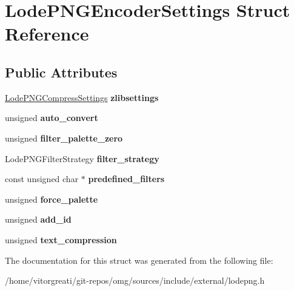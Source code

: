 \hypertarget{struct_lode_p_n_g_encoder_settings}{}\section{Lode\+P\+N\+G\+Encoder\+Settings Struct Reference}
\label{struct_lode_p_n_g_encoder_settings}
\subsection*{Public Attributes}
\begin{DoxyCompactItemize}
\item 
\mbox{\label{struct_lode_p_n_g_encoder_settings_a2c5928b4172c75e27de467870f2ff946}} 
\mbox{\hyperlink{struct_lode_p_n_g_compress_settings}{Lode\+P\+N\+G\+Compress\+Settings}} {\bfseries zlibsettings}
\item 
\mbox{\label{struct_lode_p_n_g_encoder_settings_a1203b8db6532c9ff4a5c8ee692cd327a}} 
unsigned {\bfseries auto\+\_\+convert}
\item 
\mbox{\label{struct_lode_p_n_g_encoder_settings_a0d82e8f2fabcb6cebbc54b80922945f1}} 
unsigned {\bfseries filter\+\_\+palette\+\_\+zero}
\item 
\mbox{\label{struct_lode_p_n_g_encoder_settings_a5e18e4eb941763a2e3e6c65ee9f0729c}} 
Lode\+P\+N\+G\+Filter\+Strategy {\bfseries filter\+\_\+strategy}
\item 
\mbox{\label{struct_lode_p_n_g_encoder_settings_a4446f87b5283f25664802a1be037e76e}} 
const unsigned char $\ast$ {\bfseries predefined\+\_\+filters}
\item 
\mbox{\label{struct_lode_p_n_g_encoder_settings_a04dc9622ccd1d7c74c56291409aa512a}} 
unsigned {\bfseries force\+\_\+palette}
\item 
\mbox{\label{struct_lode_p_n_g_encoder_settings_a893aa542aa7c122c32ee36dd716fbcb2}} 
unsigned {\bfseries add\+\_\+id}
\item 
\mbox{\label{struct_lode_p_n_g_encoder_settings_a6ffdcb8e85a65ea208fe027be072d710}} 
unsigned {\bfseries text\+\_\+compression}
\end{DoxyCompactItemize}


The documentation for this struct was generated from the following file\+:\begin{DoxyCompactItemize}
\item 
/home/vitorgreati/git-\/repos/omg/sources/include/external/lodepng.\+h\end{DoxyCompactItemize}
